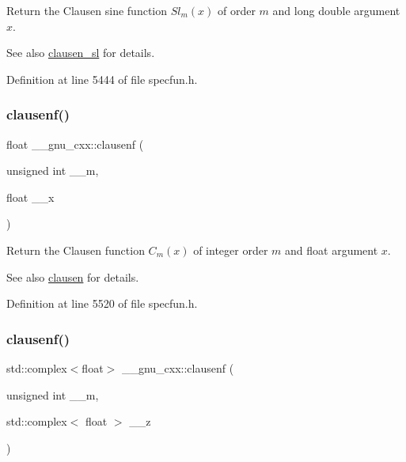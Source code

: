 Return the Clausen sine function $ Sl_m(x) $ of order $ m $ and {\ttfamily long double} argument $ x $.

\begin{DoxySeeAlso}{See also}
\hyperlink{group__gnu__math__spec__func_gacb757b00309213cd96bb2bc6b5dc3c24}{clausen\+\_\+sl} for details. 
\end{DoxySeeAlso}


Definition at line 5444 of file specfun.\+h.

\mbox{\label{group__gnu__math__spec__func_ga6422bdec1a3c930fb1623094cd2eaff2}} 
\subsubsection{\texorpdfstring{clausenf()}{clausenf()}\hspace{0.1cm}{\footnotesize\ttfamily [1/2]}}
{\footnotesize\ttfamily float \+\_\+\+\_\+gnu\+\_\+cxx\+::clausenf (\begin{DoxyParamCaption}\item[{unsigned int}]{\+\_\+\+\_\+m,  }\item[{float}]{\+\_\+\+\_\+x }\end{DoxyParamCaption})\hspace{0.3cm}{\ttfamily [inline]}}

Return the Clausen function $ C_m(x) $ of integer order $ m $ and {\ttfamily float} argument $ x $.

\begin{DoxySeeAlso}{See also}
\hyperlink{group__gnu__math__spec__func_ga54e4ba71b1f81718d6998349f91ff88f}{clausen} for details. 
\end{DoxySeeAlso}


Definition at line 5520 of file specfun.\+h.

\mbox{\label{group__gnu__math__spec__func_ga98b5ba1e5de4ef2e0e9422ac8d9ce2ad}} 
\subsubsection{\texorpdfstring{clausenf()}{clausenf()}\hspace{0.1cm}{\footnotesize\ttfamily [2/2]}}
{\footnotesize\ttfamily std\+::complex$<$float$>$ \+\_\+\+\_\+gnu\+\_\+cxx\+::clausenf (\begin{DoxyParamCaption}\item[{unsigned int}]{\+\_\+\+\_\+m,  }\item[{std\+::complex$<$ float $>$}]{\+\_\+\+\_\+z }\end{DoxyParamCaption})\hspace{0.3cm}{\ttfamily [inline]}}

